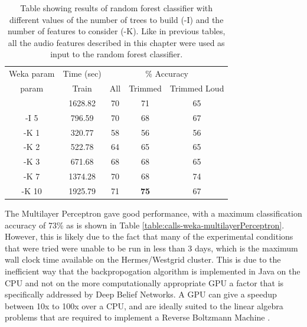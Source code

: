 \begin{table}
\begin{tabular}{|c|c|c|c|c|}
\hline
\multicolumn{1}{|c|}{Weka param} & \multicolumn{1}{c|}{Time (sec)} & \multicolumn{3}{c|}{\% Accuracy} \\
\hhline{|-|-|-|-|-|}
param & Train & All & Trimmed & Trimmed Loud \\
\hhline{|=|=|=|=|=|}
        &   1628.82  &   70 & 71 & 65 \\
 -I 5   &    796.59  &   70 & 68 & 67 \\
 -K 1   &    320.77  &   58 & 56 & 56 \\
 -K 2   &    522.78  &   64 & 65 & 65 \\
 -K 3   &    671.68  &   68 & 68 & 65 \\
 -K 7   &   1374.28  &   70 & 68 & 74 \\
 -K 10  &   1925.79  &   71 & \textbf{75} & 67 \\
\hline
\end{tabular}
\caption{Table showing results of random forest
  classifier with different values of the number of trees to build
  (-I) and the number of features to consider (-K).  Like in previous
  tables, all the audio features described in this chapter were used
  as input to the random forest classifier.}
\label{table:calls-weka-randomForest}
\end{table}

The Multilayer Perceptron gave good performance, with a maximum
classification accuracy of 73\% as is shown in Table
\ref{table:calls-weka-multilayerPerceptron}.  However, this is likely
due to the fact that many of the experimental conditions that were
tried were unable to be run in less than 3 days, which is the maximum
wall clock time available on the Hermes/Westgrid cluster.  This is due
to the inefficient way that the backpropogation algorithm is
implemented in Java on the CPU and not on the more computationally
appropriate GPU a factor that is specifically addressed by Deep Belief
Networks.  A GPU can give a speedup between 10x to 100x over a CPU,
and are ideally suited to the linear algebra problems that are
required to implement a Reverse Boltzmann Machine
\cite{hinton1986learning}.

